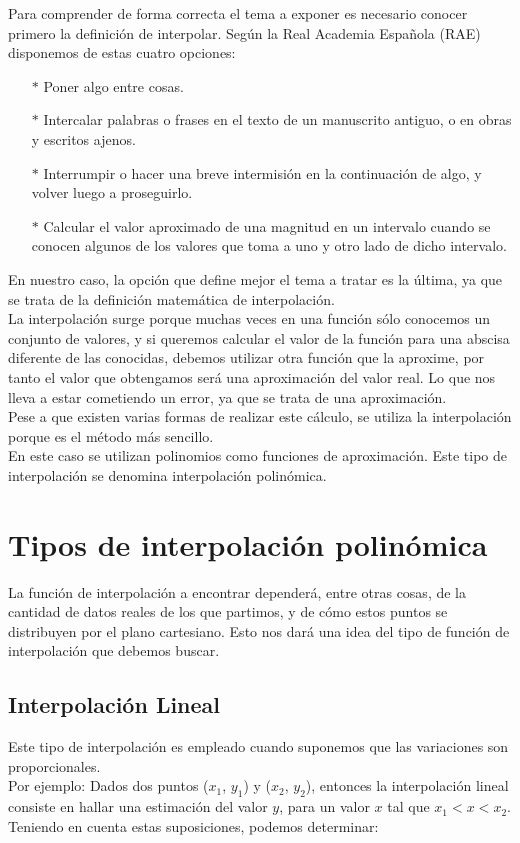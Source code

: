 \documentclass[spanish,a4paper,11pt,twoside]{report}
\begin{document}
	Para comprender de forma correcta el tema a exponer es necesario conocer primero la definición de interpolar. Según la Real Academia Española (RAE) disponemos de estas cuatro opciones: 
\begin{itemize}
  \item [$*$]
  Poner algo entre cosas.\\
  \item [$*$]
  Intercalar palabras o frases en el texto de un manuscrito antiguo, o en obras y escritos ajenos.
  \item [$*$]
  Interrumpir o hacer una breve intermisión en la continuación de algo, y volver luego a proseguirlo.
  \item [$*$]
  Calcular el valor aproximado de una magnitud en un intervalo cuando se conocen algunos de los valores que toma a uno y otro lado de dicho intervalo.\\
\end{itemize}


En nuestro caso, la opción que define mejor el tema a tratar es la última, ya que se trata de la definición matemática de interpolación.\\
La interpolación surge porque muchas veces en una función sólo conocemos un conjunto de valores, y si queremos calcular el valor de la función para una abscisa diferente de las conocidas, debemos utilizar otra función que la aproxime, por tanto el valor que obtengamos será una aproximación del valor real. Lo que nos lleva a estar cometiendo un error, ya que se trata de una aproximación.\\
Pese a que existen varias formas de realizar este cálculo, se utiliza la interpolación porque es el método más sencillo.\\
En este caso se utilizan polinomios como funciones de aproximación. Este tipo de interpolación se denomina interpolación polinómica.\\


\section{Tipos de interpolación polinómica}
\label{2:sec:1}
  La función de interpolación a encontrar dependerá, entre otras cosas, de la cantidad de datos reales de los que partimos, y de cómo estos puntos se distribuyen por el plano cartesiano. Esto nos dará una idea del tipo de función de interpolación que debemos buscar.

\subsection{Interpolación Lineal}
  Este tipo de interpolación es empleado cuando suponemos que las variaciones son proporcionales.\\
  Por ejemplo: 
Dados dos puntos ($x_1$, $y_1$) y  ($x_2$, $y_2$), entonces la interpolación lineal consiste en hallar una estimación del valor $y$, para un valor $x$  tal que $x_1<x <x_2$. Teniendo en cuenta estas suposiciones, podemos determinar:
\end{document}
